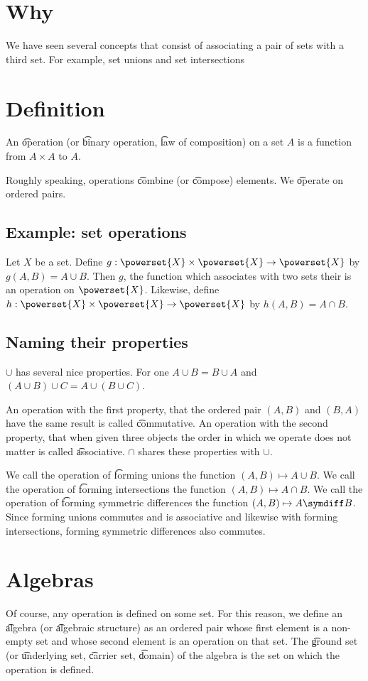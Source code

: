 
\section*{Why}

We have seen several concepts that consist of associating a pair of sets with a third set.
For example, set unions and set intersections

\section*{Definition}

An \t{operation} (or \t{binary operation}, \t{law of composition}) on a set $A$ is a function from $A \times  A$ to $A$.

Roughly speaking, operations \t{combine} (or \t{compose}) elements.
We \t{operate} on ordered pairs.

\subsection*{Example: set operations}

Let $X$ be a set.
Define $g: \powerset{X} \times  \powerset{X} \to \powerset{X}$ by $g(A, B) = A \cup B$.
Then $g$, the function which associates with two sets their is an operation on $\powerset{X}$.
Likewise, define $h : \powerset{X} \times  \powerset{X} \to \powerset{X}$ by $h(A, B) = A \cap  B$.

\subsection*{Naming their properties}

$\cup$ has several nice properties.
For one $A \cup B = B \cup A$ and $(A \cup B) \cup C = A \cup (B \cup C)$.

An operation with the first property, that the ordered pair $(A, B)$ and $(B, A)$ have the same result is called \t{commutative}.
An operation with the second property, that when given three objects the order in which we operate does not matter is called \t{associative}.
$\cap $ shares these properties with $\cup$.

We call the operation of \t{forming unions} the function $(A, B) \mapsto A \cup B$.
We call the operation of \t{forming intersections} the function $(A, B) \mapsto A \cap  B$.
We call the operation of \t{forming symmetric differences} the function $(A, B) \mapsto A \symdiff B$.
Since forming unions commutes and is associative and likewise with forming intersections, forming symmetric differences also commutes.

\section*{Algebras}

Of course, any operation is defined on some set.
For this reason, we define an \t{algebra} (or \t{algebraic structure}) as an ordered pair whose first element is a non-empty set and whose second element is an operation on that set.
The \t{ground set} (or \t{underlying set}, \t{carrier set}, \t{domain}) of the algebra is the set on which the operation is defined.
